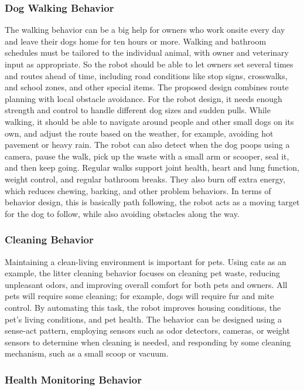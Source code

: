 \documentclass[conference,letterpaper]{IEEEtran}
\begin{document}
\subsubsection{Dog Walking Behavior}

The walking behavior can be a big help for owners who work onsite every day and leave their dogs home for ten hours or more. Walking and bathroom schedules must be tailored to the individual animal, with owner and veterinary input as appropriate. So the robot should be able to let owners set several times and routes ahead of time, including road conditions like stop signs, crosswalks, and school zones, and other special items. The proposed design combines route planning with local obstacle avoidance. For the robot design, it needs enough strength and control to handle different dog sizes and sudden pulls. While walking, it should be able to navigate around people and other small dogs on its own, and adjust the route based on the weather, for example, avoiding hot pavement or heavy rain. The robot can also detect when the dog poops using a camera, pause the walk, pick up the waste with a small arm or scooper, seal it, and then keep going. Regular walks support joint health, heart and lung function, weight control, and regular bathroom breaks. They also burn off extra energy, which reduces chewing, barking, and other problem behaviors. In terms of behavior design, this is basically path following, the robot acts as a moving target for the dog to follow, while also avoiding obstacles along the way.

\subsubsection{Cleaning Behavior}

Maintaining a clean-living environment is important for pets. Using cats as an example, the litter cleaning behavior focuses on cleaning pet waste, reducing unpleasant odors, and improving overall comfort for both pets and owners. All pets will require some cleaning; for example, dogs will require fur and mite control. By automating this task, the robot improves housing conditions, the pet's living conditions, and pet health. The behavior can be designed using a sense-act pattern, employing sensors such as odor detectors, cameras, or weight sensors to determine when cleaning is needed, and responding by some cleaning mechanism, such as a small scoop or vacuum.

\subsubsection{Health Monitoring Behavior}
\end{document}
